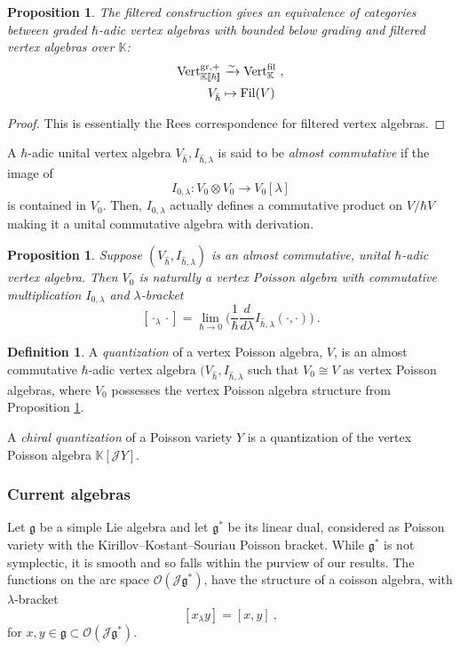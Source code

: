 \documentclass[11pt]{amsart}
\numberwithin{equation}{section}
\newtheorem{prop}[theo]{Proposition}
\theoremstyle{definition}
\newtheorem{defn}[theo]{Definition}
\newcommand{\bb}{\mathbb}
\newcommand{\mc}{\mathcal}
\newcommand{\fph}{{[\![\hbar]\!]}}
\newcommand{\ik}{{\bb K}}
\newcommand{\0}{{\textbf{0}}}
\newcommand{\gr}{\textup{gr}}
\def\JJ{{\mc J}}
\def\OO{{\mc O}}
\def\gf{\mathfrak{g}}
\def \hhb{{\hat \hbar}}
\begin{document}
\begin{prop}\label{prop:Rees for hadic VOA}
	The filtered construction gives an equivalence of categories between graded $\hbar$-adic vertex algebras with bounded below grading and filtered vertex algebras over $\ik$:
	\begin{align*}
	{\rm Vert}_{\ik\fph}^{\gr,+} &\xrightarrow{\sim} {\rm Vert}_{\ik}^{\rm fil}~,\\
	V_\hhb &\mapsto {\rm Fil}(V)
	\end{align*}
\end{prop}
\begin{proof}
 This is essentially the Rees correspondence for filtered vertex algebras.
\end{proof}




A $\hbar$-adic unital vertex algebra $V_\hhb, I_{\hhb,\lambda}$ is said to be \emph{almost commutative} if the image of
\[
I_{0,\lambda} : V_0 \otimes V_0 \rightarrow V_0[\lambda]
\]
is contained in $V_0$. Then, $I_{0,\lambda}$ actually defines a commutative product on $V/\hbar V$ making it a unital commutative algebra with derivation.
\begin{prop}\label{prop:almost commutative hbar central fibre}
	Suppose $(V_\hhb,I_{\hhb,\lambda})$ is an almost commutative, unital $\hbar$-adic vertex algebra. Then $V_0$ is naturally a vertex Poisson algebra with commutative multiplication $I_{0,\lambda}$ and $\lambda$-bracket
	\[
	[\cdot_\lambda \cdot] = \lim_{\hbar\rightarrow 0} \bigg(\frac{1}{\hbar}\frac{d}{d\lambda}I_{\hhb,\lambda}(\cdot,\cdot) \bigg)~.
	\]
\end{prop}

	
\begin{defn}\label{defn:chiral quantization}
A \emph{quantization} of a vertex Poisson algebra, $V$, is an almost commutative $\hbar$-adic vertex algebra $(V_\hhb,I_{\hhb,\lambda}$ such that $V_0\cong V$ as vertex Poisson algebras, where $V_0$ possesses the vertex Poisson algebra structure from Proposition \ref{prop:almost commutative hbar central fibre}.

A \emph{chiral quantization} of a Poisson variety $Y$ is a quantization of the vertex Poisson algebra $\ik[\JJ Y]$.
\end{defn}



\subsubsection{Current algebras}
Let $\gf$ be a simple Lie algebra and let $\gf^*$ be its linear dual, considered as Poisson variety with the Kirillov--Kostant--Souriau Poisson bracket. While $\gf^*$ is not symplectic, it is smooth and so falls within the purview of our results. The functions on the arc space $\OO(\JJ\gf^*)$, have the structure of a coisson algebra, with $\lambda$-bracket
\[
[x_\lambda y]  = [x,y]~,
\]
for $x,y\in \gf\subset \OO(\JJ \gf^*)$.
\end{document}
